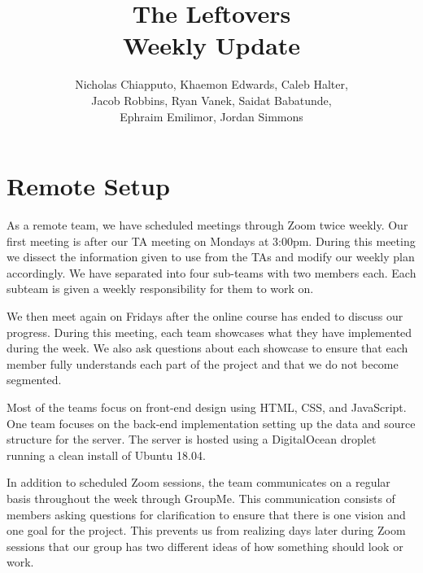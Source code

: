 \documentclass[12pt]{article}
\begin{document}
	\title{ The Leftovers \\
			\Large{Weekly Update} }

	\author{	Nicholas Chiapputo, Khaemon Edwards, Caleb Halter, \\
				Jacob Robbins, Ryan Vanek, Saidat Babatunde, \\
				Ephraim Emilimor, Jordan Simmons
	}

	\maketitle

	\section{Remote Setup}
		As a remote team, we have scheduled meetings through Zoom twice weekly. Our first meeting is after our TA meeting on Mondays at 3:00pm. During this meeting we dissect the information given to use from the TAs and modify our weekly plan accordingly. We have separated into four sub-teams with two members each. Each subteam is given a weekly responsibility for them to work on.

		We then meet again on Fridays after the online course has ended to discuss our progress. During this meeting, each team showcases what they have implemented during the week. We also ask questions about each showcase to ensure that each member fully understands each part of the project and that we do not become segmented. 

		Most of the teams focus on front-end design using HTML, CSS, and JavaScript. One team focuses on the back-end implementation setting up the data and source structure for the server. The server is hosted using a DigitalOcean droplet running a clean install of Ubuntu 18.04. 

		In addition to scheduled Zoom sessions, the team communicates on a regular basis throughout the week through GroupMe. This communication consists of members asking questions for clarification to ensure that there is one vision and one goal for the project. This prevents us from realizing days later during Zoom sessions that our group has two different ideas of how something should look or work.
\end{document}
